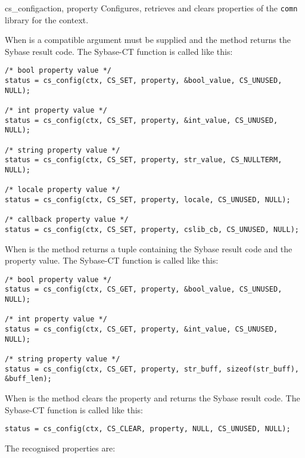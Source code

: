 \begin{methoddesc}[CS_CONTEXT]{cs_config}{action, property }
Configures, retrieves and clears properties of the \texttt{comn}
library for the context.

When  is  a compatible  argument
must be supplied and the method returns the Sybase result code.  The
Sybase-CT  function is called like this:

\begin{verbatim}
/* bool property value */
status = cs_config(ctx, CS_SET, property, &bool_value, CS_UNUSED, NULL);

/* int property value */
status = cs_config(ctx, CS_SET, property, &int_value, CS_UNUSED, NULL);

/* string property value */
status = cs_config(ctx, CS_SET, property, str_value, CS_NULLTERM, NULL);

/* locale property value */
status = cs_config(ctx, CS_SET, property, locale, CS_UNUSED, NULL);

/* callback property value */
status = cs_config(ctx, CS_SET, property, cslib_cb, CS_UNUSED, NULL);
\end{verbatim}

When  is  the method returns a tuple
containing the Sybase result code and the property value.  The
Sybase-CT  function is called like this:

\begin{verbatim}
/* bool property value */
status = cs_config(ctx, CS_GET, property, &bool_value, CS_UNUSED, NULL);

/* int property value */
status = cs_config(ctx, CS_GET, property, &int_value, CS_UNUSED, NULL);

/* string property value */
status = cs_config(ctx, CS_GET, property, str_buff, sizeof(str_buff), &buff_len);
\end{verbatim}

When  is  the method clears the property
and returns the Sybase result code.  The Sybase-CT
 function is called like this:

\begin{verbatim}
status = cs_config(ctx, CS_CLEAR, property, NULL, CS_UNUSED, NULL);
\end{verbatim}

The recognised properties are:


\end{methoddesc}
